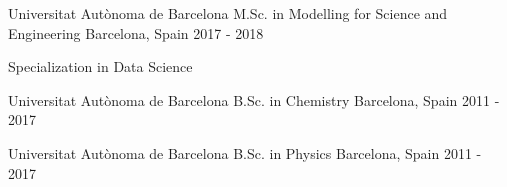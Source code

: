 

\begin{cventries}

  \cventry
    {Universitat Autònoma de Barcelona} %
    {M.Sc. in Modelling for Science and Engineering} %
    {Barcelona, Spain} %
    {2017 - 2018} %
    {
      \begin{cvitems} %
        \item {Specialization in Data Science}
      \end{cvitems}
    }

  \cventry
    {Universitat Autònoma de Barcelona} %
    {B.Sc. in Chemistry} %
    {Barcelona, Spain} %
    {2011 - 2017} %
    {}
    
\vspace{-10pt}

  \cventry
    {Universitat Autònoma de Barcelona} %
    {B.Sc. in Physics} %
    {Barcelona, Spain} %
    {2011 - 2017} %
    {}

\vspace{-10pt}

\end{cventries}

